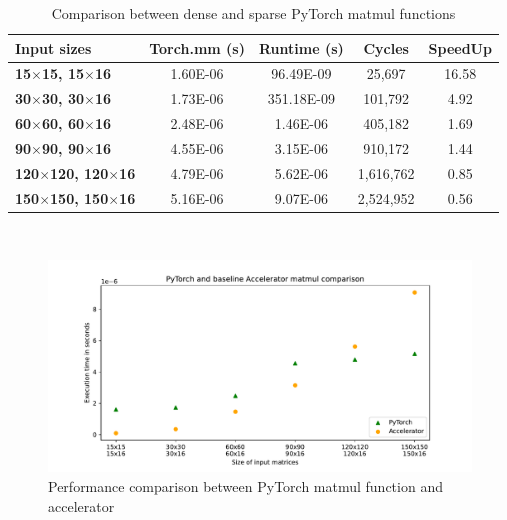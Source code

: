 \begin{table}[t]
\centering
    \begin{tabular}{|p{9em} c c c c  |}
    \hline
    \textbf{Input sizes} & \textbf{Torch.mm (s)} & \textbf{Runtime (s)} & \textbf{Cycles} & \textbf{SpeedUp} \T\B \\
    \hline \hline
    \textbf{15$\times$15, 15$\times$16} & 1.60E-06  & 96.49E-09 & 25,697 & 16.58 \T\B\\
    \hline
    \textbf{30$\times$30, 30$\times$16} & 1.73E-06  & 351.18E-09 & 101,792 & 4.92 \T\B\\
    \hline
    \textbf{60$\times$60, 60$\times$16} & 2.48E-06  & 1.46E-06 & 405,182 & 1.69 \T\B\\
    \hline
    \textbf{90$\times$90, 90$\times$16} & 4.55E-06  & 3.15E-06 & 910,172 & 1.44 \T\B\\
    \hline
    \textbf{120$\times$120, 120$\times$16} & 4.79E-06  & 5.62E-06 & 1,616,762 & 0.85 \T\B\\
    \hline
    \textbf{150$\times$150, 150$\times$16} & 5.16E-06  & 9.07E-06 & 2,524,952 & 0.56 \T\B\\
    \hline
    \end{tabular}
    \\[10pt]
    \caption{Comparison between dense and sparse PyTorch matmul functions}
    \label{tab:pytorch-accelerator-comparison}
\end{table}

\begin{figure}[t]
    \centering
    \includegraphics[height=0.4\textwidth]{Images/matmul_comparison}
    \caption{Performance comparison between PyTorch matmul function and accelerator}
    \label{fig:pytorch-accelerator-comparison}
\end{figure}

